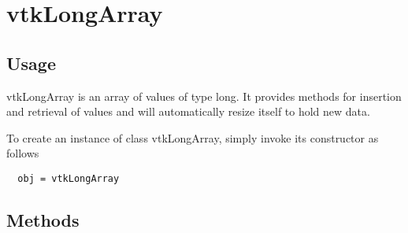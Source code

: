 \section{vtkLongArray}

\subsection{Usage}

 vtkLongArray is an array of values of type long.  It provides
 methods for insertion and retrieval of values and will
 automatically resize itself to hold new data.

To create an instance of class vtkLongArray, simply
invoke its constructor as follows
\begin{verbatim}
  obj = vtkLongArray
\end{verbatim}
\subsection{Methods}

